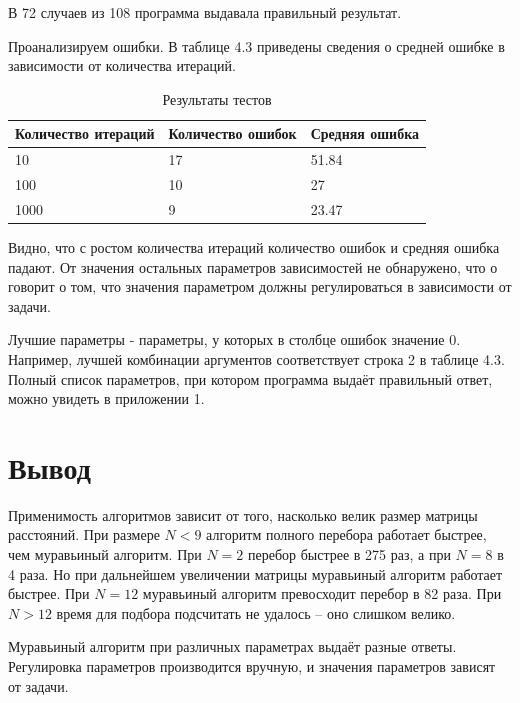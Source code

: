 В 72 случаев из 108 программа выдавала правильный результат.

Проанализируем ошибки. В таблице 4.3 приведены сведения о средней ошибке в зависимости от количества итераций.

\FloatBarrier
\begin{table}[h]
	\caption{Результаты тестов}
	\centering
	\begin{tabular}{ | l | l | l |}
		\hline
		Количество итераций & Количество ошибок & Средняя ошибка \\ 
		\hline
		10 & 17 & 51.84 \\
		100 & 10 & 27 \\
		1000 & 9 & 23.47 \\
		\hline
	\end{tabular}
\end{table}
\FloatBarrier

Видно, что с ростом количества итераций количество ошибок и средняя ошибка падают.
От значения остальных параметров зависимостей не обнаружено, что о говорит о том,
что значения параметром должны регулироваться в зависимости от задачи.

Лучшие параметры - параметры, у которых в столбце ошибок значение 0.
Например, лучшей комбинации аргументов соответствует строка 2 в таблице 4.3.
Полный список параметров, при котором программа выдаёт правильный ответ, можно увидеть в приложении 1.

\section{Вывод}
Применимость алгоритмов зависит от того, насколько велик размер матрицы расстояний.
При размере $ N < 9 $ алгоритм полного перебора работает быстрее, чем муравьиный алгоритм.
При $ N = 2 $ перебор быстрее в 275 раз, а при $ N = 8 $ в 4 раза.
Но при дальнейшем увеличении матрицы муравьиный алгоритм работает быстрее.
При $ N = 12 $ муравьиный алгоритм превосходит перебор в 82 раза.
При $ N > 12 $ время для подбора подсчитать не удалось -- оно слишком велико.

Муравьиный алгоритм при различных параметрах выдаёт разные ответы.
Регулировка параметров производится вручную, и значения параметров зависят от задачи.